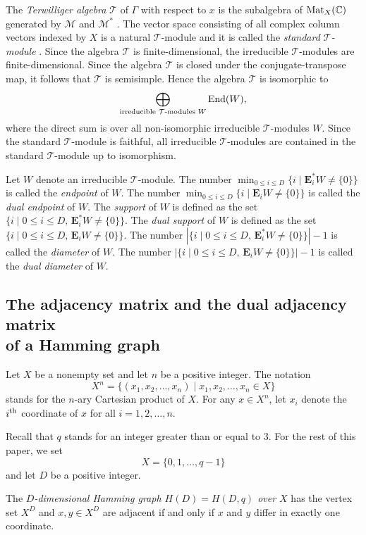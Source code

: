 \documentclass[pdftex]{sigma}%
\def\E{\mathbf E}
\def\C{\mathbb C}
\def\End{{\rm End}}
\def\Mat{{\rm Mat}}
\def\M{\mathcal M}
\def\T{\mathcal T}
\numberwithin{equation}{section}
\begin{document}
The {\it Terwilliger algebra} $\T$ of $\Gamma$ with respect to $x$ is the subalgebra of $\Mat_X(\C)$ generated by $\M$ and $\M^*$ \cite[Definition 3.3]{TerAlgebraI}.
The vector space consisting of all complex column vectors indexed by $X$ is a natural $\T$-module and it is called the {\it standard $\T$-module} \cite[p.~368]{TerAlgebraI}.
Since the algebra $\T$ is finite-dimensional, the irreducible $\T$-modules are finite-dimensional. Since the algebra $\T$ is closed under the conjugate-transpose map, it follows that $\T$ is semisimple.
Hence the algebra $\T$ is isomorphic to
\[
\bigoplus_{\text{irreducible $\T$-modules $W$}} \End(W),
\]
where the direct sum is over all non-isomorphic irreducible $\T$-modules $W$.
Since the standard $\T$-module is faithful, all irreducible $\T$-modules are contained in the standard $\T$-module up to isomorphism.

Let $W$ denote an irreducible $\T$-module.
The number $\min_{0\leq i\leq D}\{i\mid \E_i^* W\not=\{0\}\}$ is called the {\it endpoint} of $W$.
The number
$\min_{0\leq i\leq D}\{i\mid \E_i W\not=\{0\}\}$ is called the {\it dual endpoint} of $W$.
The {\it support} of $W$ is defined as the set $\{i\mid 0\leq i\leq D,\, \E_i^* W\not=\{0\}\}$. The {\it dual support} of $W$ is defined as the set $\{i\mid 0\leq i\leq D,\, \E_i W\not=\{0\}\}$.
The number
$|\{i\mid 0\leq i\leq D,\, \E_i^* W\not=\{0\}\}|-1$
is called the {\it diameter} of $W$. The number
$|\{i\mid 0\leq i\leq D,\, \E_i W\not=\{0\}\}|-1$
is called the {\it dual diameter} of $W$.


\subsection[The adjacency matrix and the dual adjacency matrix of a Hamming grap]{The adjacency matrix and the dual adjacency matrix \\of a Hamming graph}
\label{s:A&A*_Hamming}

Let $X$ be a nonempty set and let $n$ be a positive integer.
The notation
\[
X^n=\{(x_1,x_2,\dots,x_n)\mid x_1,x_2,\dots,x_n\in X\}
\]
stands for the $n$-ary Cartesian product of $X$.
For any $x\in X^n$, let $x_i$ denote the $i^{\rm th}$ coordinate of $x$ for all $i=1,2,\dots,n$.

Recall that $q$ stands for an integer greater than or equal to $3$. For the rest of this paper, we set
\[
X=\{0,1,\dots,q-1\}
\]
and let $D$ be a positive integer.

\begin{Definition}%
The {\it $D$-dimensional Hamming graph $H(D)=H(D,q)$ over $X$} has the vertex set $X^D$ and $x,y\in X^D$ are adjacent if and only if $x$ and $y$ differ in exactly one coordinate.
\end{Definition}
\end{document}
